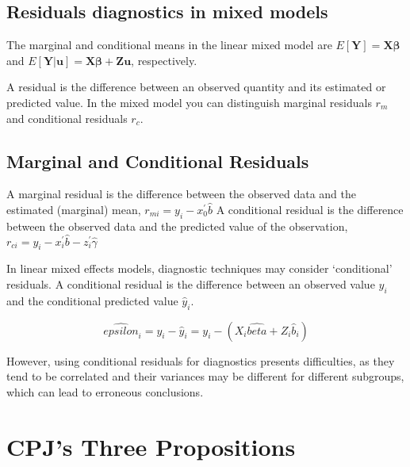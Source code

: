 \documentclass[12pt, a4paper]{report}
\theoremstyle{plain}
\theoremstyle{definition}
\theoremstyle{remark}
\begin{document}
\subsection{Residuals diagnostics in mixed models}

The marginal and conditional means in the linear mixed model are
$E[\boldsymbol{Y}] = \boldsymbol{X}\boldsymbol{\beta}$ and
$E[\boldsymbol{Y|\boldsymbol{u}}] = \boldsymbol{X}\boldsymbol{\beta} + \boldsymbol{Z}\boldsymbol{u}$, respectively.

A residual is the difference between an observed quantity and its estimated or predicted value. In the mixed
model you can distinguish marginal residuals $r_m$ and conditional residuals $r_c$. 


\subsection{Marginal and Conditional Residuals}

A marginal residual is the difference between the observed data and the estimated (marginal) mean, $r_{mi} = y_i - x_0^{\prime} \hat{b}$
A conditional residual is the difference between the observed data and the predicted value of the observation,
$r_{ci} = y_i - x_i^{\prime} \hat{b} - z_i^{\prime} \hat{\gamma}$

In linear mixed effects models, diagnostic techniques may consider `conditional' residuals. A conditional residual is the difference between an observed value $y_{i}$ and the conditional predicted value $\hat{y}_{i} $.

\[ \hat{epsilon}_{i} = y_{i} - \hat{y}_{i} = y_{i} - ( X_{i}\hat{beta} + Z_{i}\hat{b}_{i}) \]

However, using conditional residuals for diagnostics presents difficulties, as they tend to be correlated and their variances may be different for different subgroups, which can lead to erroneous conclusions.





\newpage
\section{CPJ's Three Propositions} %
\end{document}
